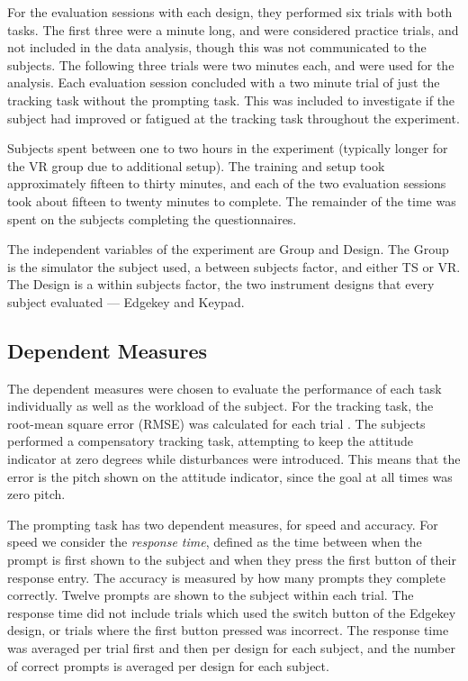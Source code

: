 For the evaluation sessions with each design, they performed six trials with both tasks.
The first three were a minute long, and were considered practice trials, and not included in the data analysis, though this was not communicated to the subjects.
The following three trials were two minutes each, and were used for the analysis.
Each evaluation session concluded with a two minute trial of just the tracking task without the prompting task.
This was included to investigate if the subject had improved or fatigued at the tracking task throughout the experiment.

Subjects spent between one to two hours in the experiment (typically longer for the VR group due to additional setup).
The training and setup took approximately fifteen to thirty minutes, and each of the two evaluation sessions took about fifteen to twenty minutes to complete.
The remainder of the time was spent on the subjects completing the questionnaires.

The independent variables of the experiment are Group and Design.
The Group is the simulator the subject used, a between subjects factor, and either TS or VR.
The Design is a within subjects factor, the two instrument designs that every subject evaluated --- Edgekey and Keypad.

\subsection{Dependent Measures}
\label{sec:de_dependent}

The dependent measures were chosen to evaluate the performance of each task individually as well as the workload of the subject.
For the tracking task, the root-mean square error (RMSE) was calculated for each trial \citep{harris_human_2011}.
The subjects performed a compensatory tracking task, attempting to keep the attitude indicator at zero degrees while disturbances were introduced.
This means that the error is the pitch shown on the attitude indicator, since the goal at all times was zero pitch.

The prompting task has two dependent measures, for speed and accuracy.
For speed we consider the \textit{response time}, defined as the time between when the prompt is first shown to the subject and when they press the first button of their response entry.
The accuracy is measured by how many prompts they complete correctly.
Twelve prompts are shown to the subject within each trial.
The response time did not include trials which used the switch button of the Edgekey design, or trials where the first button pressed was incorrect.
The response time was averaged per trial first and then per design for each subject, and the number of correct prompts is averaged per design for each subject.

